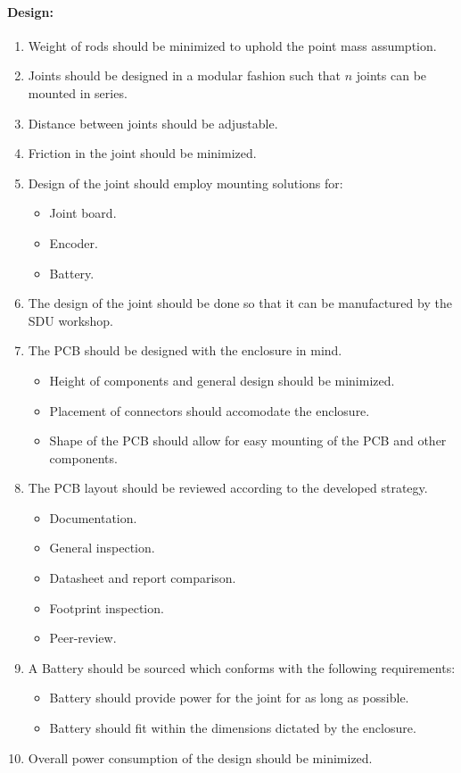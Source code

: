 \paragraph{Design:}
\begin{enumerate}[resume]
	\item Weight of rods should be minimized to uphold the point mass assumption.
	\item Joints should be designed in a modular fashion such that $n$ joints can be mounted in series.
	\item Distance between joints should be adjustable.
	\item Friction in the joint should be minimized.
	\item Design of the joint should employ mounting solutions for:
	\begin{itemize}
		\item Joint board.
		\item Encoder.
		\item Battery. 
	\end{itemize}
	\item The design of the joint should be done so that it can be manufactured by the SDU workshop.
	\item The PCB should be designed with the enclosure in mind.
	\begin{itemize}
		\item Height of components and general design should be minimized.
		\item Placement of connectors should accomodate the enclosure.
		\item Shape of the PCB should allow for easy mounting of the PCB and other components.
	\end{itemize}
	\item The PCB layout should be reviewed according to the developed strategy.
	\begin{itemize}
		\item Documentation.
		\item General inspection.
		\item Datasheet and report comparison.
		\item Footprint inspection.
		\item Peer-review.
	\end{itemize}
	\item A Battery should be sourced which conforms with the following requirements:
	\begin{itemize}
		\item Battery should provide power for the joint for as long as possible.
		\item Battery should fit within the dimensions dictated by the enclosure.
	\end{itemize}
	\item Overall power consumption of the design should be minimized.
\end{enumerate}
